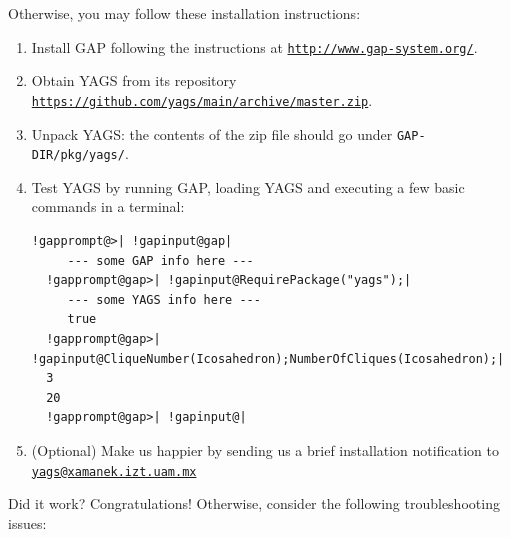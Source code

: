 \documentclass[a4paper,11pt]{report}
\begin{document}
{{Otherwise, you may follow these installation instructions: 
\begin{enumerate}
\item Install \textsf{GAP} following the instructions at \href{http://www.gap-system.org/} {\texttt{http://www.gap-system.org/}}. 
\item Obtain \textsf{YAGS} from its repository \href{https://github.com/yags/main/archive/master.zip} {\texttt{https://github.com/yags/main/archive/master.zip}}.
\item Unpack \textsf{YAGS}: the contents of the zip file should go under \texttt{GAP-DIR/pkg/yags/}.
\item Test \textsf{YAGS} by running \textsf{GAP}, loading \textsf{YAGS} and executing a few basic commands in a terminal: 


\begin{Verbatim}[commandchars=!@|,fontsize=\small,frame=single,label=Example]
  !gapprompt@>| !gapinput@gap|
     --- some GAP info here ---
  !gapprompt@gap>| !gapinput@RequirePackage("yags");|
     --- some YAGS info here ---
     true
  !gapprompt@gap>| !gapinput@CliqueNumber(Icosahedron);NumberOfCliques(Icosahedron);|
  3
  20
  !gapprompt@gap>| !gapinput@|
\end{Verbatim}

\item  (Optional) Make us happier by sending us a brief installation notification to \href{mailto://yags@xamanek.izt.uam.mx} {\texttt{yags@xamanek.izt.uam.mx}} 
\end{enumerate}
 

Did it work? Congratulations! Otherwise, consider the following
troubleshooting issues: 


}}
\end{document}
